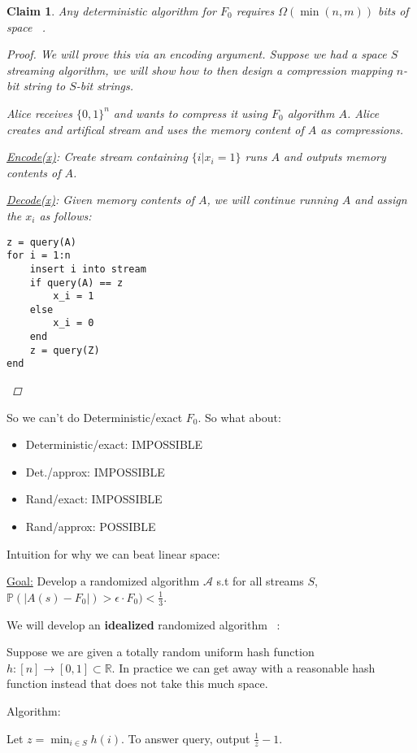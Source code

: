 \documentclass[11pt]{article}
\newcommand{\R}{\mathbb{R}}
\renewcommand{\P}{\mathbb{P}}
\newtheorem{claim}[theorem]{Claim}
\begin{document}
\begin{claim}
Any deterministic algorithm for $F_0$ requires $\Omega(\min(n,m))$ bits of space ~\cite{Alon}.
\begin{proof}
We will prove this via an \textit{encoding argument}.
Suppose we had a space $S$ streaming algorithm, we will show how to then design a compression mapping $n$-bit string to $S$-bit strings.

Alice receives $\{0,1\}^n$ and wants to compress it using $F_0$ algorithm $A$. Alice creates and artifical stream and uses the memory content of $A$ as compressions.

\underline{Encode(x)}: Create stream containing $\{i | x_i = 1\}$ runs $A$ and outputs memory contents of $A$.

\underline{Decode(x)}: Given memory contents of $A$, we will continue running $A$ and assign the $x_i$ as follows:

\begin{verbatim}
z = query(A)
for i = 1:n
    insert i into stream
    if query(A) == z
        x_i = 1
    else
        x_i = 0
    end
    z = query(Z)
end
\end{verbatim}
\end{proof}
\end{claim}

So we can't do Deterministic/exact $F_0$. So what about:
\begin{itemize}
\item Deterministic/exact: IMPOSSIBLE
\item Det./approx: IMPOSSIBLE
\item Rand/exact: IMPOSSIBLE
\item Rand/approx: POSSIBLE ~\cite{FlajoletM85}
\end{itemize}

Intuition for why we can beat linear space:

\underline{Goal:} Develop a randomized algorithm $\mathcal{A}$ s.t for all streams $S$, $\P(| A(s) - F_0 |) > \epsilon \cdot F_0) < \frac{1}{3}$.

We will develop an \textbf{idealized} randomized algorithm ~\cite{FlajoletM85}:

Suppose we are given a totally random uniform hash function $h: [n] \to [0,1] \subset \R$. In practice we can get away with a reasonable hash function instead that does not take this much space.

Algorithm:

Let $z = \min_{i \in S} h(i)$. To answer query, output $\frac{1}{z} - 1$.
\end{document}
